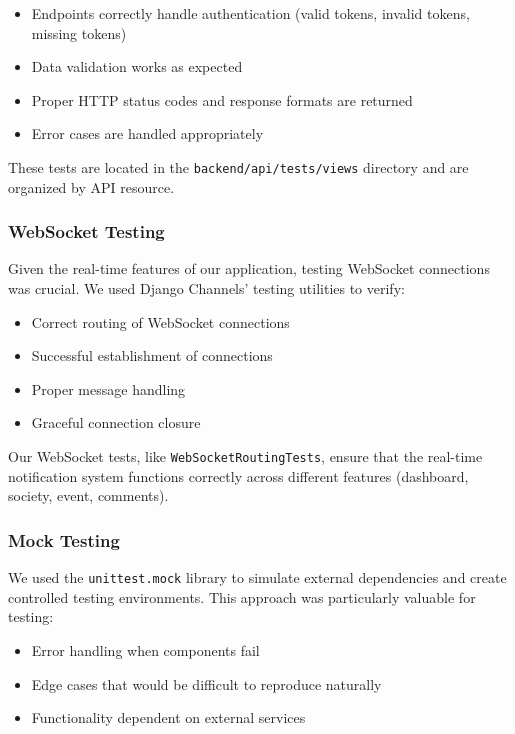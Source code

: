 \begin{itemize}
    \item Endpoints correctly handle authentication (valid tokens, invalid tokens, missing tokens)
    \item Data validation works as expected
    \item Proper HTTP status codes and response formats are returned
    \item Error cases are handled appropriately
\end{itemize}

These tests are located in the \texttt{backend/api/tests/views} directory and are organized by API resource.

\subsubsection{WebSocket Testing}
Given the real-time features of our application, testing WebSocket connections was crucial. We used Django Channels' testing utilities to verify:

\begin{itemize}
    \item Correct routing of WebSocket connections
    \item Successful establishment of connections
    \item Proper message handling
    \item Graceful connection closure
\end{itemize}

Our WebSocket tests, like \texttt{WebSocketRoutingTests}, ensure that the real-time notification system functions correctly across different features (dashboard, society, event, comments).

\subsubsection{Mock Testing}
We used the \texttt{unittest.mock} library to simulate external dependencies and create controlled testing environments. This approach was particularly valuable for testing:

\begin{itemize}
    \item Error handling when components fail
    \item Edge cases that would be difficult to reproduce naturally
    \item Functionality dependent on external services
\end{itemize}

